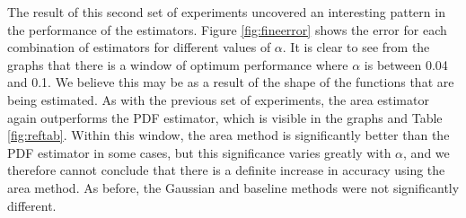 \documentclass[a4paper,11pt,twoside]{article}
\begin{document}
    The result of this second set of experiments uncovered an interesting
    pattern in the performance of the estimators. Figure \ref{fig:fineerror}
    shows the error for each combination of estimators for different values of
    $\alpha$. It is clear to see from the graphs that there is a window of
    optimum performance where $\alpha$ is between 0.04 and 0.1. We believe this
    may be as a result of the shape of the functions that are being
    estimated. As with the previous set of experiments, the area estimator again
    outperforms the PDF estimator, which is visible in the graphs and Table
    \ref{fig:reftab}. Within this window, the area method is significantly
    better than the PDF estimator in some cases, but this significance varies
    greatly with $\alpha$, and we therefore cannot conclude that there is a
    definite increase in accuracy using the area method. As before, the Gaussian
    and baseline methods were not significantly different.
\end{document}
